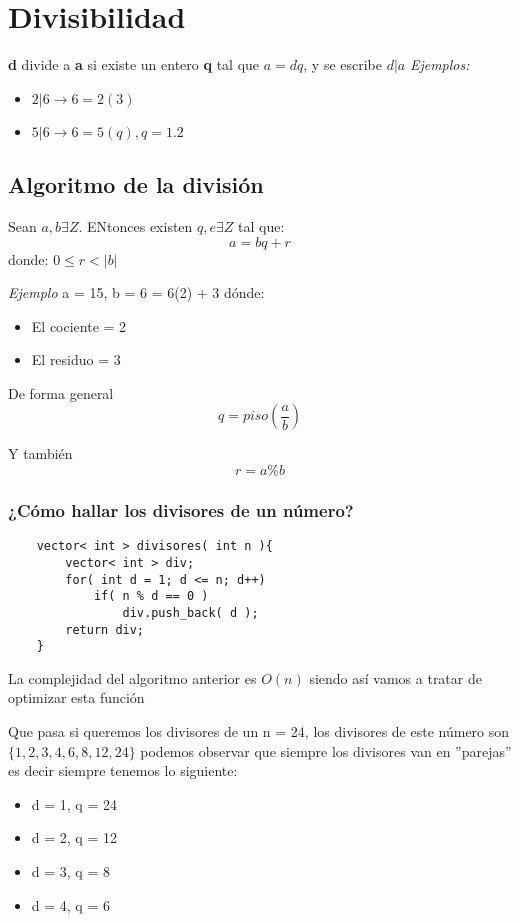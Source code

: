 \section{Divisibilidad}
\textbf{d} divide a \textbf{a} si existe un entero \textbf{q} tal que $a = dq$, y se escribe $d|a$\newline
\textit{Ejemplos:}\break 
\begin{itemize}
    \item {$2|6 \rightarrow 6 = 2(3)$}
    \item {$5|6 \rightarrow 6 = 5(q), q = 1.2$}
\end{itemize}

\subsection{Algoritmo de la división}
Sean \textbf{$a,b \exists Z$}. ENtonces existen \textbf{$q, e \exists Z$} tal que:\newline
\[ a = bq + r \]
donde: $0 \leq r < |b|$ \newline

\textit{Ejemplo} \newline
a = 15, b = 6  = 6(2) + 3 \newline 
dónde: 
\begin{itemize}
    \item {El cociente = 2}
    \item {El residuo = 3}
\end{itemize}

De forma general 
\[
    q = piso \left ( \frac{a}{b} \right )
\]

Y también 
\[
    r = a \% b    
\]

\subsubsection{¿Cómo hallar los divisores de un número?}
\begin{lstlisting}
    vector< int > divisores( int n ){
        vector< int > div;
        for( int d = 1; d <= n; d++)
            if( n % d == 0 )
                div.push_back( d );
        return div;
    }
\end{lstlisting}
La complejidad del algoritmo anterior es $O(n)$ siendo así vamos a tratar de optimizar esta función\newline

Que pasa si queremos los divisores de un n = 24, los divisores de este número son $\{1, 2, 3, 4, 6, 8, 12, 24\}$ podemos observar que siempre los divisores van en ''parejas'' es decir siempre tenemos lo siguiente: \newline
\begin{itemize}
    \item {d = 1, q = 24}
    \item {d = 2, q = 12}
    \item {d = 3, q = 8}
    \item {d = 4, q = 6}
\end{itemize}

